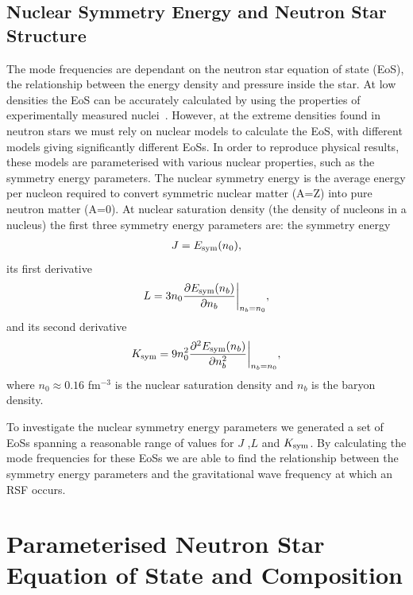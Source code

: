 \documentclass[fleqn,usenatbib]{mnras}
\begin{document}
\subsection{Nuclear Symmetry Energy and Neutron Star Structure}
\hspace{\parindent}The mode frequencies are dependant on the neutron star equation of state (EoS), the relationship between the energy density and pressure inside the star. At low densities the EoS can be accurately calculated by using the properties of experimentally measured nuclei~\citet{baym1971ground}. However, at the extreme densities found in neutron stars we must rely on nuclear models to calculate the EoS, with different models giving significantly different EoSs. In order to reproduce physical results, these models are parameterised with various nuclear properties, such as the symmetry energy parameters. The nuclear symmetry energy is the average energy per nucleon required to convert symmetric nuclear matter (A=Z) into pure neutron matter (A=0). At nuclear saturation density (the density of nucleons in a nucleus) the first three symmetry energy parameters are: the symmetry energy
\begin{align}
J=E_{\rm sym}(n_0),    
\label{eq:sym_J}
\end{align}
\noindent its first derivative 
\begin{align}
L=3n_0\frac{\partial E_{\rm sym}(n_b)}{\partial n_b}\biggr\rvert_{n_b=n_0},  
\label{eq:sym_L}
\end{align}
\noindent and its second derivative
\begin{align}
K_{\rm sym}=9n_0^2\frac{\partial^2 E_{\rm sym}(n_b)}{\partial n_b^2}\biggr\rvert_{n_b=n_0},
\label{eq:sym_K}
\end{align}
\noindent where $n_0\approx 0.16$ fm$^{-3}$ is the nuclear saturation density and $n_b$ is the baryon density.

\hspace{\parindent}To investigate the nuclear symmetry energy parameters we generated a set of EoSs spanning a reasonable range of values for $J$ ,$L$ and $K_{\rm sym}$. By calculating the mode frequencies for these EoSs we are able to find the relationship between the symmetry energy parameters and the gravitational wave frequency at which an RSF occurs.







\section{Parameterised Neutron Star Equation of State and Composition}
\end{document}
